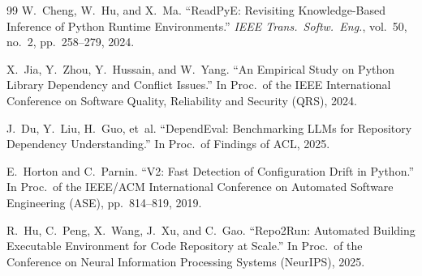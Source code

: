 \documentclass[sigconf,screen]{acmart}
\begin{document}
\begin{thebibliography}{99}
W.~Cheng, W.~Hu, and X.~Ma.
\newblock ``ReadPyE: Revisiting Knowledge-Based Inference of Python Runtime Environments.''
\newblock \emph{IEEE Trans.\ Softw.\ Eng.}, vol.~50, no.~2, pp.~258--279, 2024.

X.~Jia, Y.~Zhou, Y.~Hussain, and W.~Yang.
\newblock ``An Empirical Study on Python Library Dependency and Conflict Issues.''
\newblock In Proc.\ of the IEEE International Conference on Software Quality, Reliability and Security (QRS), 2024.

J.~Du, Y.~Liu, H.~Guo, et~al.
\newblock ``DependEval: Benchmarking LLMs for Repository Dependency Understanding.''
\newblock In Proc.\ of Findings of ACL, 2025.

E.~Horton and C.~Parnin.
\newblock ``V2: Fast Detection of Configuration Drift in Python.''
\newblock In Proc.\ of the IEEE/ACM International Conference on Automated Software Engineering (ASE), pp.~814--819, 2019.

R.~Hu, C.~Peng, X.~Wang, J.~Xu, and C.~Gao.
\newblock ``Repo2Run: Automated Building Executable Environment for Code Repository at Scale.''
\newblock In Proc.\ of the Conference on Neural Information Processing Systems (NeurIPS), 2025.

\end{thebibliography}

\balance
\end{document}
